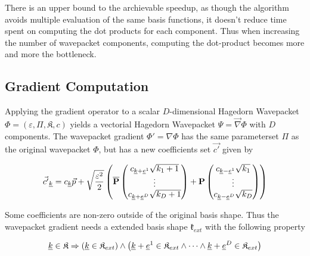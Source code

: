 \documentclass{article}
\begin{document}
There is an upper bound to the archievable speedup, as though the algorithm
avoids multiple evaluation of the same basis functions, it doesn't reduce
time spent on computing the dot products for each component.
Thus when increasing the number of wavepacket components, computing the dot-product becomes
more and more the bottleneck.

\subsection{Gradient Computation}
Applying the gradient operator to a scalar \(D\)-dimensional Hagedorn Wavepacket 
\( \Phi = \left( \varepsilon, \Pi, \mathfrak{K}, c \right)\)
yields a vectorial Hagedorn Wavepacket \(\Psi=\vec{\nabla}\Phi\) with \(D\) components.
The wavepacket gradient \(\Phi' = \nabla \Phi\) has the same parameterset \(\Pi\)
as the original wavepacket \(\Phi\), but has a new coefficients set \(\vec{c'}\) given by

\begin{equation}
  \label{eq:compute_grad_coeff}
  \vec{c'}_{\underline{k}}=c_{\underline{k}}\vec{p}+\sqrt{\frac{\varepsilon^2}{2}}
  \left(\mathbf{\overline{P}}
    \begin{pmatrix}
      c_{\underline{k}+\underline{e}^1}\sqrt{k_1+1} \\
      \vdots \\
      c_{\underline{k}+\underline{e}^D}\sqrt{k_D+1} \\
    \end{pmatrix}
    +\mathbf{P}
    \begin{pmatrix}
      c_{\underline{k}-\underline{e}^1}\sqrt{k_1} \\
      \vdots \\
      c_{\underline{k}-\underline{e}^D}\sqrt{k_D} \\
    \end{pmatrix}
  \right)
\end{equation}

Some coefficients are non-zero outside of the original basis shape.
Thus the wavepacket gradient needs a extended basis shape \(\mathfrak{k}_{ext}\)
with the following property

\begin{equation}
  \label{eq:shape_extension_requirement}
  \underline{k} \in \mathfrak{K} \Rightarrow
  \left(
     \underline{k} \in \mathfrak{K}_{ext}
  \right)
  \wedge
  \left(
    \underline{k}+\underline{e}^1 \in \mathfrak{K}_{ext}
    \wedge \dots \wedge
    \underline{k}+\underline{e}^D \in \mathfrak{K}_{ext}
  \right)
\end{equation}
\end{document}
